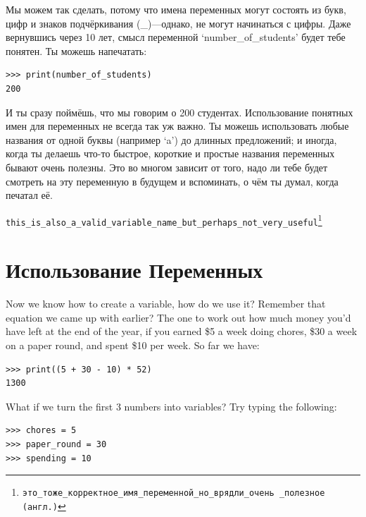 Мы можем так сделать, потому что имена переменных могут состоять из букв, цифр и знаков подчёркивания (\_)---однако, не могут начинаться с цифры.  Даже вернувшись через 10 лет, смысл переменной `number\_of\_students' будет тебе понятен.  Ты можешь напечатать:

\begin{listing}
\begin{verbatim}
>>> print(number_of_students)
200
\end{verbatim}
\end{listing}

\noindent
И ты сразу поймёшь, что мы говорим о 200 студентах.  Использование понятных имен для переменных не всегда так уж важно.  Ты можешь использовать любые названия от одной буквы (например `a') до длинных предложений; и иногда, когда ты делаешь что-то быстрое, короткие и простые названия переменных бывают очень полезны. Это во многом зависит от того, надо ли тебе будет смотреть на эту переменную в будущем и вспоминать, о чём ты думал, когда печатал её.

\begin{listing}
\texttt{this\_is\_also\_a\_valid\_variable\_name\_but\_perhaps\_not\_very\_useful\footnote{это\_тоже\_корректное\_имя\_переменной\_но\_врядли\_очень \_полезное (англ.)}}
\end{listing}

\section{Использование Переменных}

Now we know how to create a variable, how do we use it?  Remember that equation we came up with earlier?  The one to work out how much money you'd have left at the end of the year, if you earned \$5 a week doing chores, \$30 a week on a paper round, and spent \$10 per week.  So far we have:

\begin{listing}
\begin{verbatim}
>>> print((5 + 30 - 10) * 52)
1300
\end{verbatim}
\end{listing}

\noindent
What if we turn the first 3 numbers into variables?  Try typing the following:

\begin{listing}
\begin{verbatim}
>>> chores = 5
>>> paper_round = 30
>>> spending = 10
\end{verbatim}
\end{listing}

